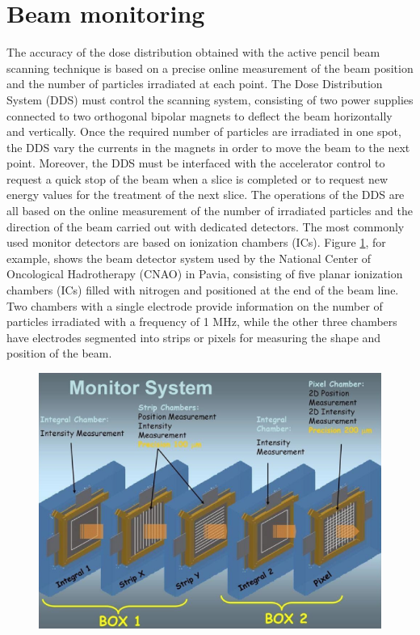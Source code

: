\section{Beam monitoring}
\noindent The accuracy of the dose distribution obtained with the active pencil beam scanning technique is based on a precise online measurement of the beam position and the number of particles irradiated at each point.
The Dose Distribution System (DDS)\cite{pencil} must control the scanning system, consisting of two power supplies connected to two orthogonal bipolar magnets to deflect the beam horizontally and vertically.
Once the required number of particles are irradiated in one spot, the DDS vary the currents in the magnets in order to move the beam to the next point.
Moreover, the DDS must be interfaced with the accelerator control to request a quick stop of the beam when a slice is completed or to request new energy values for the treatment of the next slice.
The operations of the DDS are all based on the online measurement of the number of irradiated particles and the direction of the beam carried out with dedicated detectors.
\newline
The most commonly used monitor detectors are based on ionization chambers (ICs).
Figure \ref{fig:monitor}, for example, shows the beam detector system used by the National Center of Oncological Hadrotherapy (CNAO) in Pavia, consisting of five planar ionization chambers (ICs) filled with nitrogen and positioned at the end of the beam line.
Two chambers with a single electrode provide information on the number of particles irradiated with a frequency of 1 MHz, while the other three chambers have electrodes segmented into strips or pixels for measuring the shape and position of the beam.
\begin{figure}[H]
	\centering
	\includegraphics[width=0.7\linewidth]{IMG/ch1/MonitorSystem.PNG}
	\caption{}
	\label{fig:monitor}
\end{figure}
